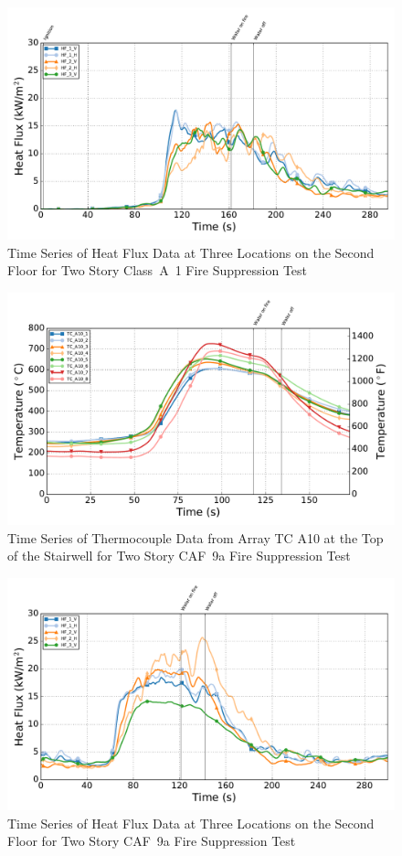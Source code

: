 \documentclass[12pt,oneside]{book}
\begin{document}
\begin{figure}[!ht]
	\includegraphics[width=.85\columnwidth]{../Figures/Script_Figures/Test_41a_West_061415_Heat_Flux}
	\caption{Time Series of Heat Flux Data at Three Locations on the Second Floor for Two Story Class~A~1 Fire Suppression Test}
	\label{fig:app_classa1_hf}
\end{figure}

\begin{figure}[!ht]
	\includegraphics[width=.85\columnwidth]{../Figures/Script_Figures/Test_41_West_061415_TC_A10}
	\caption{Time Series of Thermocouple Data from Array TC A10 at the Top of the Stairwell for Two Story CAF~9a Fire Suppression Test}
	\label{fig:app_caf9a_tca10}
\end{figure}

\begin{figure}[!ht]
	\includegraphics[width=.85\columnwidth]{../Figures/Script_Figures/Test_41_West_061415_Heat_Flux}
	\caption{Time Series of Heat Flux Data at Three Locations on the Second Floor for Two Story CAF~9a Fire Suppression Test}
	\label{fig:app_caf9a_hf}
\end{figure}
\end{document}

